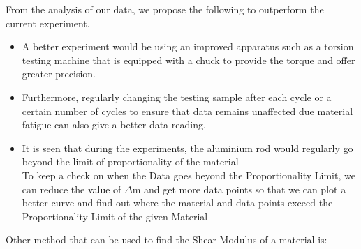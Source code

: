 \documentclass[12pt,a4paper]{article}	%
\begin{document}
From the analysis of our data, we propose the following to outperform the current experiment.\\
\begin{itemize}
\item A better experiment would be using an improved apparatus such as a torsion testing machine that is equipped with a chuck to provide the torque and offer greater precision. \\

\item Furthermore, regularly changing the testing sample after each cycle or a certain number of cycles to ensure that data remains unaffected due material fatigue can also give a better data reading.\\

\item It is seen that during the experiments, the aluminium rod would regularly go beyond the limit of proportionality of the material\\

To keep a check on when the Data goes beyond the Proportionality Limit, we can reduce the value of $\Delta$m and get more data points so that we can plot a better curve and find out where the material and data points exceed the Proportionality Limit of the given Material\\
\end{itemize}
\thispagestyle{empty}	%
\pagebreak
\thispagestyle{empty}	%
Other method that can be used to find the Shear Modulus of a material is:\\
\end{document}
